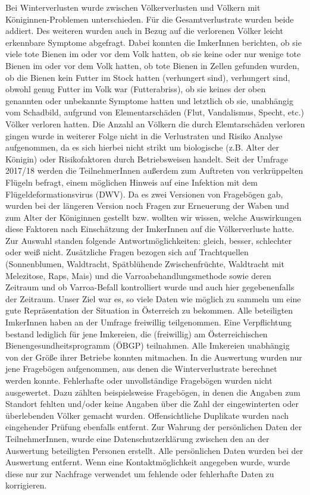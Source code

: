 \newline
Bei Winterverlusten wurde zwischen Völkerverlusten und Völkern mit Königinnen-Problemen unterschieden. Für die Gesamtverlustrate wurden beide addiert. Des weiteren wurden auch in Bezug auf die verlorenen Völker leicht erkennbare Symptome abgefragt. Dabei konnten die ImkerInnen berichten, ob sie viele tote Bienen im oder vor dem Volk hatten, ob sie keine oder nur wenige tote Bienen im oder vor dem Volk hatten, ob tote Bienen in Zellen gefunden wurden, ob die Bienen kein Futter im Stock hatten (verhungert sind), verhungert sind, obwohl genug Futter im Volk war (Futterabriss), ob sie keines der oben genannten oder unbekannte Symptome hatten und letztlich ob sie, unabhängig vom Schadbild, aufgrund von Elementarschäden (Flut, Vandalismus, Specht, etc.) Völker verloren hatten. Die Anzahl an Völkern die durch Elemtarschäden verloren gingen wurde in weiterer Folge nicht in die Verlustraten und Risiko Analyse aufgenommen, da es sich hierbei nicht strikt um biologische (z.B. Alter der Königin) oder Risikofaktoren durch Betriebsweisen handelt. Seit der Umfrage 2017/18 werden die TeilnehmerInnen außerdem zum Auftreten von verkrüppelten Flügeln befragt, einem möglichen Hinweis auf eine Infektion mit dem Flügeldeformationsvirus (DWV).
\newline
Da es zwei Versionen von Fragebögen gab, wurden bei der längeren Version noch Fragen zur Erneuerung der Waben und zum Alter der Königinnen gestellt bzw. wollten wir wissen, welche Auswirkungen diese Faktoren nach Einschätzung der ImkerInnen auf die Völkerverluste hatte. Zur Auswahl standen folgende Antwortmöglichkeiten: gleich, besser, schlechter oder weiß nicht. Zusätzliche Fragen bezogen sich auf Trachtquellen (Sonnenblumen, Waldtracht, Spätblühende Zwischenfrüchte, Waldtracht mit Melezitose, Raps, Mais) und die Varroabehandlungsmethode sowie deren Zeitraum und ob Varroa-Befall kontrolliert wurde und auch hier gegebenenfalls der Zeitraum. 
\newline
Unser Ziel war es, so viele Daten wie möglich zu sammeln um eine gute Repräsentation der Situation in Österreich zu bekommen. Alle beteiligten ImkerInnen haben an der Umfrage freiwillig teilgenommen. Eine Verpflichtung bestand lediglich für jene Imkereien, die (freiwillig) am Österreichischen Bienengesundheitsprogramm (ÖBGP) teilnahmen. Alle Imkereien unabhängig von der Größe ihrer Betriebe konnten mitmachen. In die Auswertung wurden nur jene Fragebögen aufgenommen, aus denen die Winterverlustrate berechnet werden konnte. Fehlerhafte oder unvollständige Fragebögen wurden nicht ausgewertet. Dazu zählten beispielsweise Fragebögen, in denen die Angaben zum Standort fehlten und/oder keine Angaben über die Zahl der eingewinterten oder überlebenden Völker gemacht wurden.  Offensichtliche Duplikate wurden nach eingehender Prüfung ebenfalls entfernt.
\newline
Zur Wahrung der persönlichen Daten der TeilnehmerInnen, wurde eine Datenschutzerklärung zwischen den an der Auswertung beteiligten Personen erstellt. Alle persönlichen Daten wurden bei der Auswertung entfernt. Wenn eine Kontaktmöglichkeit angegeben wurde, wurde diese nur zur Nachfrage verwendet um fehlende oder fehlerhafte Daten zu korrigieren.

